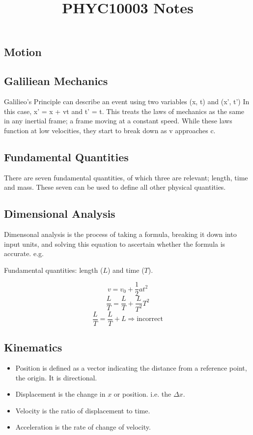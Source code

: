 \documentclass[12pt]{report}
\begin{document}
\title{PHYC10003 Notes}
\begin{flushleft}
\chapter*{Motion}

\section*{Galiliean Mechanics}
Galilieo's Principle can describe an event using two variables (x, t) and (x', t')
In this case, x' = x + vt and t' = t. This treats the laws of mechanics as the 
same in any inertial frame; a frame moving at a constant speed. While these laws
function at low velocities, they start to break down as v approaches c.

\section*{Fundamental Quantities}
There are seven fundamental quantities, of which three are relevant; length, time
and mass. These seven can be used to define all other physical quantities.

\section*{Dimensional Analysis}
Dimensonal analysis is the process of taking a formula, breaking it down into input
units, and solving this equation to ascertain whether the formula is accurate. e.g.
\bigskip
\begin{center}
Fundamental quantities: length (\(L\)) and time (\(T\)).
\end{center}
\[v = v_0 + \frac{1}{2}at^2\]
\[\frac{L}{T} = \frac{L}{T} + \frac{L}{T^2}T^2\]
\[\frac{L}{T} = \frac{L}{T} + L \Rightarrow \mathrm{incorrect}\]

\section*{Kinematics}
\begin{itemize}
    \item Position is defined as a vector indicating the distance from a reference point, the origin. It is directional.
    \item Displacement is the change in \(x\) or position. i.e. the \(\Delta x\).
    \item Velocity is the ratio of displacement to time. 
    \item Acceleration is the rate of change of velocity.
\end{itemize}


\end{flushleft}
\end{document}
